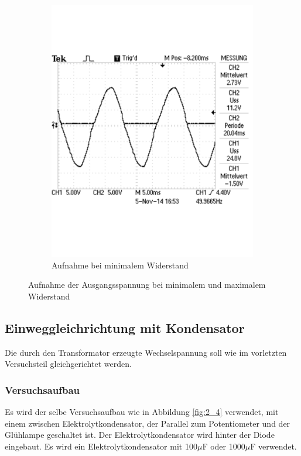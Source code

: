 \documentclass[12pt,a4paper]{article}
\begin{document}
\begin{figure}[H]
\begin{subfigure}[b]{0.48\textwidth}
                \includegraphics[width=\textwidth , scale = 0.4]{2_3_2.pdf}
                \caption[Aufnahme bei minimalem Widerstand]{Aufnahme bei minimalem Widerstand}
  				\label{fig:2_3_2}
        \end{subfigure}
        \caption{Aufnahme der Ausgangsspannung bei minimalem und maximalem Widerstand}
        \label{fig:2_3}
\end{figure}


\subsection{Einweggleichrichtung mit Kondensator}
Die durch den Transformator erzeugte Wechselspannung soll wie im vorletzten Versuchsteil gleichgerichtet werden.
\subsubsection{Versuchsaufbau}
Es wird der selbe Versuchsaufbau wie in Abbildung \ref{fig:2_4} verwendet, mit einem zwischen Elektrolytkondensator, der Parallel zum Potentiometer und der Glühlampe geschaltet ist. Der Elektrolytkondensator wird hinter der Diode eingebaut. Es wird ein Elektrolytkondensator mit 100$\mu$F oder 1000$\mu$F verwendet.
\end{document}
